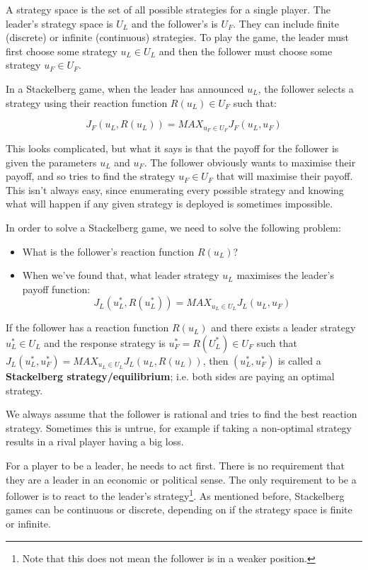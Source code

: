 A strategy space is the set of all possible strategies for a single player. The
leader's strategy space is $U_L$ and the follower's is $U_F$. They can include
finite (discrete) or infinite (continuous) strategies. To play the game, the
leader must first choose some strategy $u_L \in U_L$ and then the follower must
choose some strategy $u_F \in U_F$.

In a Stackelberg game, when the leader has announced $u_L$, the follower selects
a strategy using their reaction function $R(u_L) \in U_F$ such that:

\[
  J_F(u_L, R(u_L)) = MAX_{u_F \in U_F} J_F(u_L, u_F)
\]

This looks complicated, but what it says is that the payoff for the follower is
given the parameters $u_L$ and $u_F$. The follower obviously wants to maximise
their payoff, and so tries to find the strategy $u_F \in U_F$ that will maximise
their payoff. This isn't always easy, since enumerating every possible strategy
and knowing what will happen if any given strategy is deployed is sometimes
impossible.

In order to solve a Stackelberg game, we need to solve the following problem:

\begin{itemize}
  \item What is the follower's reaction function $R(u_L)$?
  \item When we've found that, what leader strategy $u_L$ maximises the leader's
  payoff function:
  \[
    J_L(u^*_L, R(u^*_L)) = MAX_{u_L \in U_L} J_L(u_L, u_F)
  \]
\end{itemize}

If the follower has a reaction function $R(u_L)$ and there exists a leader
strategy $u^*_L \in U_L$ and the response strategy is $u^*_F = R(U^*_L) \in U_F$
such that $J_L(u^*_L, u^*_F) = MAX_{u_L \in U_L} J_L(u_L, R(u_L))$, then
$(u^*_L, u^*_F)$ is called a \textbf{Stackelberg strategy/equilibrium}; i.e.
both sides are paying an optimal strategy.

We always assume that the follower is rational and tries to find the best
reaction strategy. Sometimes this is untrue, for example if taking a non-optimal
strategy results in a rival player having a big loss.

For a player to be a leader, he needs to act first. There is no requirement that
they are a leader in an economic or political sense. The only requirement to be
a follower is to react to the leader's strategy\footnote{Note that this does not
mean the follower is in a weaker position.}. As mentioned before, Stackelberg
games can be continuous or discrete, depending on if the strategy space is
finite or infinite.


